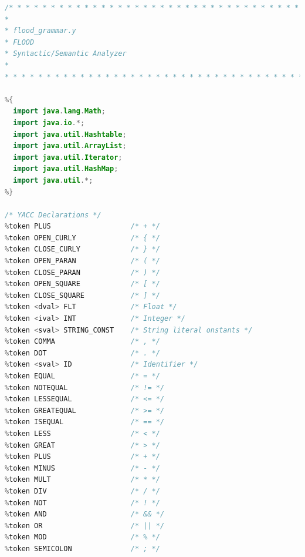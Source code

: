 \documentclass[12pt]{report}
\begin{document}
\begin{singlespace}
\begin{lstlisting}[language=Java,label=some-code,caption={flood$\_$grammar.y}]
/* * * * * * * * * * * * * * * * * * * * * * * * * * * * * * * * * * * * *
*
* flood_grammar.y
* FLOOD
* Syntactic/Semantic Analyzer
*
* * * * * * * * * * * * * * * * * * * * * * * * * * * * * * * * * * * * */

%{
  import java.lang.Math;
  import java.io.*;
  import java.util.Hashtable;
  import java.util.ArrayList;
  import java.util.Iterator;
  import java.util.HashMap;
  import java.util.*;
%}

/* YACC Declarations */
%token PLUS                   /* + */
%token OPEN_CURLY             /* { */ 
%token CLOSE_CURLY            /* } */
%token OPEN_PARAN             /* ( */
%token CLOSE_PARAN            /* ) */
%token OPEN_SQUARE            /* [ */
%token CLOSE_SQUARE           /* ] */
%token <dval> FLT             /* Float */
%token <ival> INT             /* Integer */
%token <sval> STRING_CONST    /* String literal onstants */
%token COMMA                  /* , */
%token DOT                    /* . */
%token <sval> ID              /* Identifier */
%token EQUAL                  /* = */
%token NOTEQUAL               /* != */
%token LESSEQUAL              /* <= */
%token GREATEQUAL             /* >= */
%token ISEQUAL                /* == */
%token LESS                   /* < */
%token GREAT                  /* > */
%token PLUS                   /* + */
%token MINUS                  /* - */
%token MULT                   /* * */
%token DIV                    /* / */
%token NOT                    /* ! */
%token AND                    /* && */
%token OR                     /* || */
%token MOD                    /* % */
%token SEMICOLON              /* ; */


\end{lstlisting}
\end{singlespace}
\end{document}
